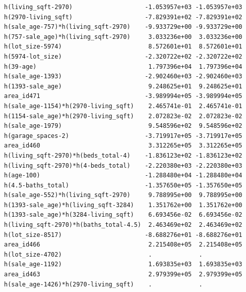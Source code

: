 \documentclass[
]{article}
\begin{document}
\begin{verbatim}
h(living_sqft-2970)                    -1.053957e+03 -1.053957e+03
h(2970-living_sqft)                    -7.829391e+02 -7.829391e+02
h(sale_age-757)*h(living_sqft-2970)    -9.933729e+00 -9.933729e+00
h(757-sale_age)*h(living_sqft-2970)     3.033236e+00  3.033236e+00
h(lot_size-5974)                        8.572601e+01  8.572601e+01
h(5974-lot_size)                       -2.320722e+02 -2.320722e+02
h(39-age)                               1.797396e+04  1.797396e+04
h(sale_age-1393)                       -2.902460e+03 -2.902460e+03
h(1393-sale_age)                        9.248625e+01  9.248625e+01
area_id471                             -3.989994e+05 -3.989994e+05
h(sale_age-1154)*h(2970-living_sqft)    2.465741e-01  2.465741e-01
h(1154-sale_age)*h(2970-living_sqft)    2.072823e-02  2.072823e-02
h(sale_age-1979)                        9.548596e+02  9.548596e+02
h(garage_spaces-2)                     -3.719917e+05 -3.719917e+05
area_id460                              3.312265e+05  3.312265e+05
h(living_sqft-2970)*h(beds_total-4)    -1.836123e+02 -1.836123e+02
h(living_sqft-2970)*h(4-beds_total)    -2.220380e+03 -2.220380e+03
h(age-100)                             -1.288480e+04 -1.288480e+04
h(4.5-baths_total)                     -1.357650e+05 -1.357650e+05
h(sale_age-552)*h(living_sqft-2970)     9.788995e+00  9.788995e+00
h(1393-sale_age)*h(living_sqft-3284)    1.351762e+00  1.351762e+00
h(1393-sale_age)*h(3284-living_sqft)    6.693456e-02  6.693456e-02
h(living_sqft-2970)*h(baths_total-4.5)  2.463469e+02  2.463469e+02
h(lot_size-8517)                       -8.688276e+01 -8.688276e+01
area_id466                              2.215408e+05  2.215408e+05
h(lot_size-4702)                        .             .           
h(sale_age-1192)                        1.693835e+03  1.693835e+03
area_id463                              2.979399e+05  2.979399e+05
h(sale_age-1426)*h(2970-living_sqft)    .             .           
                                                                  

\end{verbatim}
\end{document}
